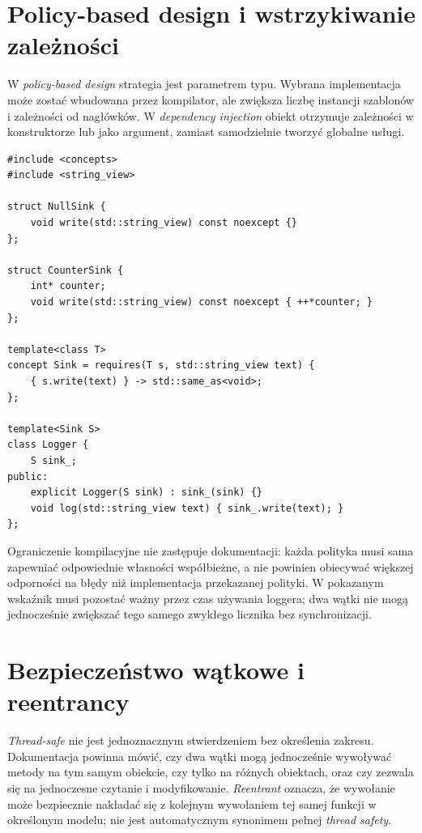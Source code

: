 \section{Policy-based design i wstrzykiwanie zależności}

W \emph{policy-based design} strategia jest parametrem typu.
Wybrana implementacja może zostać wbudowana przez kompilator,
ale zwiększa liczbę instancji szablonów i zależności od nagłówków.
W \emph{dependency injection} obiekt otrzymuje zależności w konstruktorze
lub jako argument, zamiast samodzielnie tworzyć globalne usługi.

\begin{lstlisting}[caption={Polityka zapisu z kontrola w czasie kompilacji (C++20).}]
#include <concepts>
#include <string_view>

struct NullSink {
    void write(std::string_view) const noexcept {}
};

struct CounterSink {
    int* counter;
    void write(std::string_view) const noexcept { ++*counter; }
};

template<class T>
concept Sink = requires(T s, std::string_view text) {
    { s.write(text) } -> std::same_as<void>;
};

template<Sink S>
class Logger {
    S sink_;
public:
    explicit Logger(S sink) : sink_(sink) {}
    void log(std::string_view text) { sink_.write(text); }
};
\end{lstlisting}

Ograniczenie kompilacyjne nie zastępuje dokumentacji: każda polityka
 musi sama zapewniać odpowiednie własności współbieżne,
a  nie powinien obiecywać większej odporności na błędy
niż implementacja przekazanej polityki.
W pokazanym  wskaźnik musi pozostać ważny przez czas
używania loggera; dwa wątki nie mogą jednocześnie zwiększać tego samego
zwykłego licznika bez synchronizacji.

\section{Bezpieczeństwo wątkowe i reentrancy}

\emph{Thread-safe} nie jest jednoznacznym stwierdzeniem bez określenia
zakresu. Dokumentacja powinna mówić, czy dwa wątki mogą jednocześnie
wywoływać metody na tym samym obiekcie, czy tylko na różnych obiektach,
oraz czy zezwala się na jednoczesne czytanie i modyfikowanie.
\emph{Reentrant} oznacza, że wywołanie może bezpiecznie nakładać się
z kolejnym wywołaniem tej samej funkcji w określonym modelu; nie jest
automatycznym synonimem pełnej \emph{thread safety}.

